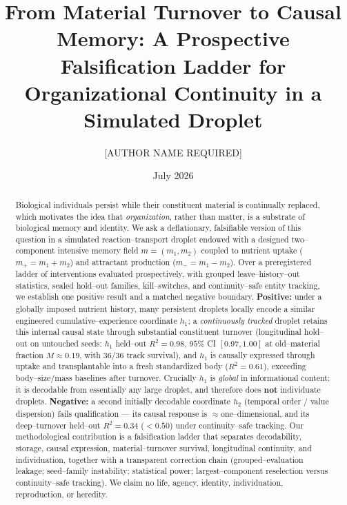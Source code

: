 \documentclass[11pt]{article}
\title{\textbf{From Material Turnover to Causal Memory: A Prospective Falsification Ladder for Organizational Continuity in a Simulated Droplet}}
\author[1]{[AUTHOR NAME REQUIRED]}
\affil[1]{[AFFILIATION REQUIRED] \quad ORCID: [ORCID IF AVAILABLE]}
\date{July 2026}
\begin{document}
\maketitle

\begin{abstract}
\noindent Biological individuals persist while their constituent material is continually replaced, which motivates
the idea that \emph{organization}, rather than matter, is a substrate of biological memory and identity. We ask a
deflationary, falsifiable version of this question in a simulated reaction--transport droplet endowed with a designed
two--component intensive memory field $m=(m_1,m_2)$ coupled to nutrient uptake ($m_+=m_1+m_2$) and attractant
production ($m_-=m_1-m_2$). Over a preregistered ladder of interventions evaluated prospectively, with grouped
leave--history--out statistics, sealed hold--out families, kill--switches, and continuity--safe entity tracking, we
establish one positive result and a matched negative boundary. \textbf{Positive:} under a globally imposed nutrient
history, many persistent droplets locally encode a similar engineered cumulative--experience coordinate $h_1$; a
\emph{continuously tracked} droplet retains this internal causal state through substantial constituent turnover
(longitudinal hold--out on untouched seeds: $h_1$ held--out $R^2=0.98$, $95\%$ CI $[0.97,1.00]$ at old--material
fraction $M\approx0.19$, with $36/36$ track survival), and $h_1$ is causally expressed through uptake and
transplantable into a fresh standardized body ($R^2=0.61$), exceeding body--size/mass baselines after turnover.
Crucially $h_1$ is \emph{global} in informational content: it is decodable from essentially any large droplet, and
therefore does \textbf{not} individuate droplets. \textbf{Negative:} a second initially decodable coordinate $h_2$
(temporal order / value dispersion) fails qualification --- its causal response is $\approx$one--dimensional, and its
deep--turnover held--out $R^2=0.34$ ($<0.50$) under continuity--safe tracking. Our methodological contribution is a
falsification ladder that separates decodability, storage, causal expression, material--turnover survival,
longitudinal continuity, and individuation, together with a transparent correction chain (grouped--evaluation
leakage; seed--family instability; statistical power; largest--component reselection versus continuity--safe
tracking). We claim no life, agency, identity, individuation, reproduction, or heredity.
\end{abstract}
\end{document}

